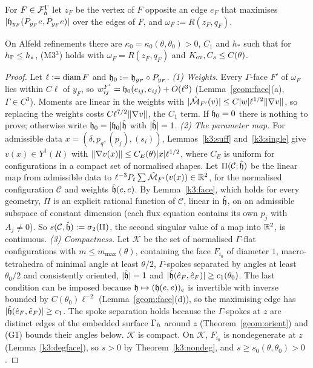 For $F\in\mathcal F_h^\Gamma$ let $z_F$ be the vertex of $F$ opposite an edge $e_F$ that maximises $|\mathfrak h_{y_F}(P_{y_F}e,P_{y_F}e)|$ over the edges of $F$, and $\omega_F:=R(z_F,q_F)$.

\begin{theorem}[Uniform witness, $k=3$]\label{k3:witness}
On Alfeld refinements there are $\kappa_0=\kappa_0(\theta,\theta_0)>0$, $C_1$ and $h_\ast$ such that for $h_\Gamma\le h_\ast$, (M3$^3$) holds with $\omega_F=R(z_F,q_F)$ and $K_{\rm ov},C_s\le C(\theta)$.
\end{theorem}

\begin{proof}
Let $\ell:=\operatorname{diam} F$ and $\mathfrak h_0:=\mathfrak h_{y_F}\circ P_{y_F}$.
\emph{(1) Weights.} Every $\Gamma$-face $F'$ of $\omega_F$ lies within $C\ell$ of $y_F$, so $w^{F'}_{ij}=\mathfrak h_0(e_{ij},e_{ij})+O(\ell^3)$ (Lemma~\ref{geom:face}(a), $\Gamma\in C^3$). Moments are linear in the weights with $|\hat{\mathcal M}_{F'}(v)|\le C|w|\ell^{1/2}\lVert \nabla v\rVert$, so replacing the weights costs $C\ell^{7/2}\lVert \nabla v\rVert$, the $C_1$ term. If $\mathfrak h_0=0$ there is nothing to prove; otherwise write $\mathfrak h_0=|\mathfrak h_0|\hat{\mathfrak h}$ with $|\hat{\mathfrak h}|=1$.
\emph{(2) The parameter map.} For admissible data $x=(\delta,p_q,(p_j),(s_i))$, Lemmas~\ref{k3:suff} and~\ref{k3:single} give $v(x)\in Y^1(R)$ with $\lVert \nabla v(x)\rVert\le C_E(\theta)|x|\ell^{1/2}$, where $C_E$ is uniform for configurations in a compact set of normalised shapes. Let $\Pi(\mathcal C;\hat{\mathfrak h})$ be the linear map from admissible data to $\ell^{-3}P_t\sum\hat{\mathcal M}_{F'}(v(x))\in\mathbb R^2$, for the normalised configuration $\mathcal C$ and weights $\hat{\mathfrak h}(e,e)$. By Lemma~\ref{k3:face}, which holds for every geometry, $\Pi$ is an explicit rational function of $\mathcal C$, linear in $\hat{\mathfrak h}$, on an admissible subspace of constant dimension (each flux equation contains its own $p_j$ with $A_j\ne0$). So $s(\mathcal C,\hat{\mathfrak h}):=\sigma_2(\Pi)$, the second singular value of a map into $\mathbb R^2$, is continuous.
\emph{(3) Compactness.} Let $\mathcal K$ be the set of normalised $\Gamma$-flat configurations with $m\le m_{\max}(\theta)$, containing the face $F_{i_0}$ of diameter $1$, macro-tetrahedra of minimal angle at least $\theta/2$, $\Gamma$-spokes separated by angles at least $\theta_0/2$ and consistently oriented, $|\hat{\mathfrak h}|=1$ and $|\hat{\mathfrak h}(\hat e_F,\hat e_F)|\ge c_1(\theta_0)$. The last condition can be imposed because $\mathfrak h\mapsto(\mathfrak h(e,e))_e$ is invertible with inverse bounded by $C(\theta_0)\ell^{-2}$ (Lemma~\ref{geom:face}(d)), so the maximising edge has $|\hat{\mathfrak h}(\hat e_F,\hat e_F)|\ge c_1$. The spoke separation holds because the $\Gamma$-spokes at $z$ are distinct edges of the embedded surface $\Gamma_h$ around $z$ (Theorem~\ref{geom:orient}) and (G1) bounds their angles below. $\mathcal K$ is compact. On $\mathcal K$, $F_{i_0}$ is nondegenerate at $z$ (Lemma~\ref{k3:degface}), so $s>0$ by Theorem~\ref{k3:nondeg}, and $s\ge s_0(\theta,\theta_0)>0$.

\end{proof}
